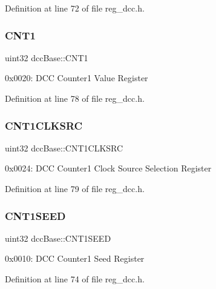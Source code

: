 Definition at line 72 of file reg\+\_\+dcc.\+h.

\mbox{\label{structdccBase_a88d8af27ca66e5991f1ba5fd28a5d0c3}} 
\subsubsection{\texorpdfstring{C\+N\+T1}{CNT1}}
{\footnotesize\ttfamily uint32 dcc\+Base\+::\+C\+N\+T1}

0x0020\+: D\+CC Counter1 Value Register 

Definition at line 78 of file reg\+\_\+dcc.\+h.

\mbox{\label{structdccBase_a27ce2a37291cd17e7862b781d9d9dfad}} 
\subsubsection{\texorpdfstring{C\+N\+T1\+C\+L\+K\+S\+RC}{CNT1CLKSRC}}
{\footnotesize\ttfamily uint32 dcc\+Base\+::\+C\+N\+T1\+C\+L\+K\+S\+RC}

0x0024\+: D\+CC Counter1 Clock Source Selection Register 

Definition at line 79 of file reg\+\_\+dcc.\+h.

\mbox{\label{structdccBase_a30f283000ff6a267afafedd73c210997}} 
\subsubsection{\texorpdfstring{C\+N\+T1\+S\+E\+ED}{CNT1SEED}}
{\footnotesize\ttfamily uint32 dcc\+Base\+::\+C\+N\+T1\+S\+E\+ED}

0x0010\+: D\+CC Counter1 Seed Register 

Definition at line 74 of file reg\+\_\+dcc.\+h.

\mbox{\label{structdccBase_a655b85bd1cd11cb7f50b441b07e58bed}} 
